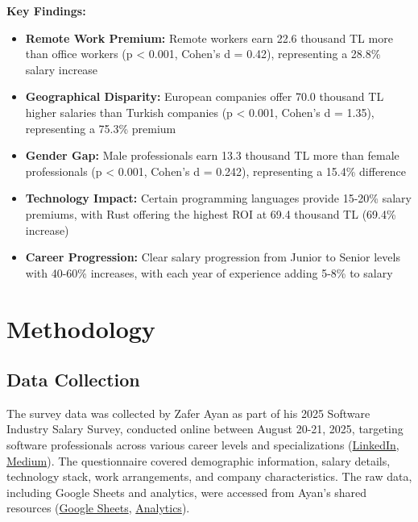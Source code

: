 \documentclass[12pt,a4paper]{article}
\begin{document}
\textbf{Key Findings:}
\begin{itemize}
    \item \textbf{Remote Work Premium:} Remote workers earn 22.6 thousand TL more than office workers (p < 0.001, Cohen's d = 0.42), representing a 28.8\% salary increase
    \item \textbf{Geographical Disparity:} European companies offer 70.0 thousand TL higher salaries than Turkish companies (p < 0.001, Cohen's d = 1.35), representing a 75.3\% premium
    \item \textbf{Gender Gap:} Male professionals earn 13.3 thousand TL more than female professionals (p < 0.001, Cohen's d = 0.242), representing a 15.4\% difference
    \item \textbf{Technology Impact:} Certain programming languages provide 15-20\% salary premiums, with Rust offering the highest ROI at 69.4 thousand TL (69.4\% increase)
    \item \textbf{Career Progression:} Clear salary progression from Junior to Senior levels with 40-60\% increases, with each year of experience adding 5-8\% to salary
\end{itemize}

\section{Methodology}

\subsection{Data Collection}
The survey data was collected by Zafer Ayan as part of his 2025 Software Industry Salary Survey, conducted online between August 20-21, 2025, targeting software professionals across various career levels and specializations (\href{https://www.linkedin.com/posts/zaferayan_geleneksel-maa%C5%9F-anketi-buyrun-httpslnkdin-activity-7363866008664629248-7YcQ}{LinkedIn}, \href{https://zaferayan.medium.com/2025-ağustos-detaylı-maaş-anketi-98446d71920a}{Medium}). The questionnaire covered demographic information, salary details, technology stack, work arrangements, and company characteristics. The raw data, including Google Sheets and analytics, were accessed from Ayan's shared resources (\href{https://docs.google.com/spreadsheets/d/1J_MW7t9e2Yi1cErFe5XCnNGaFqXkrdufgZv9Ggnm-RE/edit?usp=sharing}{Google Sheets}, \href{https://docs.google.com/forms/d/16s95bau58GBSfVwOZ8cZm7aX7eqZU_cgA0qKw9WILxI/viewanalytics}{Analytics}).
\end{document}

